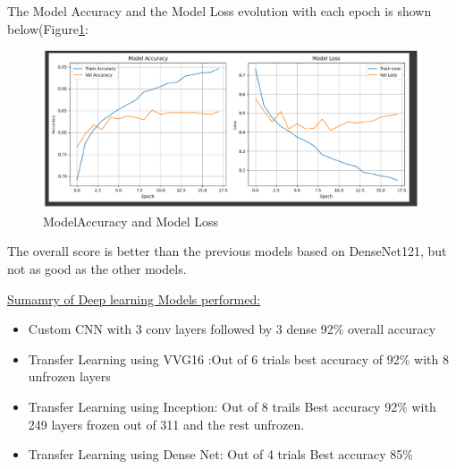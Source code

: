\documentclass{article}
\begin{document}
The Model Accuracy and the Model Loss evolution with each epoch is shown below(Figure\ref{fig:DN121graph2}:

\begin{figure}[H]
    \centering
    \includegraphics[width=0.8\linewidth]{DN121graph2.png}
    \caption{ModelAccuracy and Model Loss}
    \label{fig:DN121graph2}
\end{figure}

The overall score is  better than the previous models based on DenseNet121, but not as good as the other models.

\underline{Sumamry of Deep learning Models performed:}
\begin{itemize}
    \item Custom CNN with 3 conv layers followed by 3 dense 92\% overall accuracy
    \item Transfer Learning using VVG16 :Out of 6 trials best accuracy of 92\% with 8 unfrozen layers
    \item Transfer Learning using Inception: Out of 8 trails Best accuracy 92\% with 249 layers frozen out of 311 and the rest unfrozen.
    \item Transfer Learning using Dense Net: Out of 4 trials Best accuracy 85\%
\end{itemize}




\newpage
\end{document}
